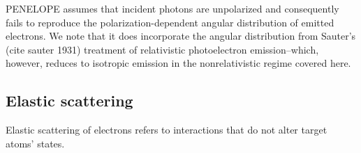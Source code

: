 \documentclass [11pt, proquest, article] {uwthesis}[2016/11/22]
\begin{document}
PENELOPE assumes that incident photons are unpolarized and consequently fails to reproduce the polarization-dependent angular distribution of emitted electrons. 
We note that it does incorporate the angular distribution from Sauter's (cite sauter 1931) treatment of relativistic photoelectron emission--which, however, reduces to isotropic emission in the nonrelativistic regime covered here.



\subsection{Elastic scattering}
Elastic scattering of electrons refers to interactions that do not alter target atoms' states. 
%

%


%
%
\end{document}
